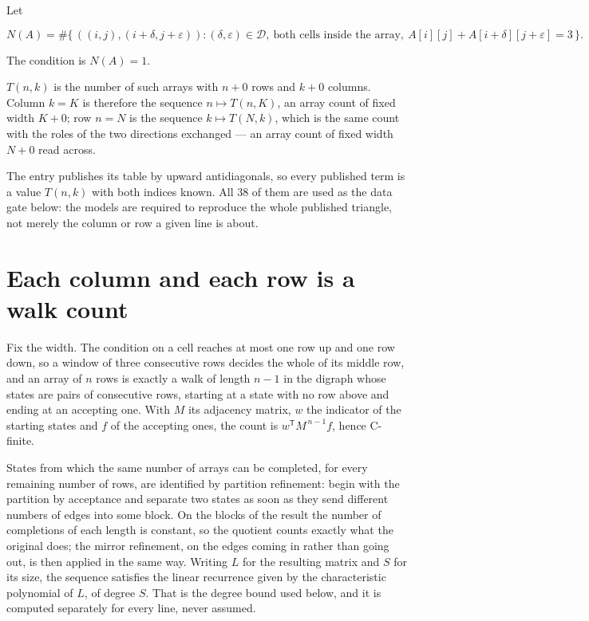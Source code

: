 \documentclass[11pt]{article}
\theoremstyle{definition}
\begin{document}
Let

\[N(A) = \#\bigl\{\,((i,j),(i{+}\delta,j{+}\varepsilon)) : (\delta,\varepsilon) \in \mathcal{D},\ \text{both cells inside the array},\ A[i][j] + A[i{+}\delta][j{+}\varepsilon] = 3\,\bigr\}.\]

The condition is $N(A) = 1$.

$T(n,k)$ is the number of such arrays with $n + 0$ rows and $k + 0$ columns. Column $k = K$ is therefore the sequence $n \mapsto T(n,K)$, an array count of fixed width $K + 0$; row $n = N$ is the sequence $k \mapsto T(N,k)$, which is the same count with the roles of the two directions exchanged --- an array count of fixed width $N + 0$ read across.

The entry publishes its table by upward antidiagonals, so every published term is a value $T(n,k)$ with both indices known. All 38 of them are used as the data gate below: the models are required to reproduce the whole published triangle, not merely the column or row a given line is about.

\section{Each column and each row is a walk count}

Fix the width. The condition on a cell reaches at most one row up and one row down, so a window of three consecutive rows decides the whole of its middle row, and an array of $n$ rows is exactly a walk of length $n-1$ in the digraph whose states are pairs of consecutive rows, starting at a state with no row above and ending at an accepting one. With $M$ its adjacency matrix, $w$ the indicator of the starting states and $f$ of the accepting ones, the count is $w^{\mathsf T}M^{\,n-1}f$, hence C-finite.

States from which the same number of arrays can be completed, for every remaining number of rows, are identified by partition refinement: begin with the partition by acceptance and separate two states as soon as they send different numbers of edges into some block. On the blocks of the result the number of completions of each length is constant, so the quotient counts exactly what the original does; the mirror refinement, on the edges coming in rather than going out, is then applied in the same way. Writing $L$ for the resulting matrix and $S$ for its size, the sequence satisfies the linear recurrence given by the characteristic polynomial of $L$, of degree $S$. That is the degree bound used below, and it is computed separately for every line, never assumed.
\end{document}
